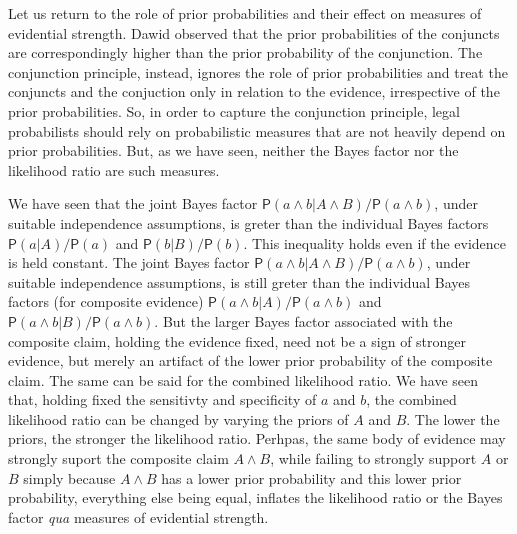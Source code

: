\documentclass[
  10pt,
  dvipsnames,enabledeprecatedfontcommands]{scrartcl}
\newcommand{\pr}[1]{\mathsf{P}(#1)}
\begin{document}
Let us return to the role of prior probabilities and their effect on
measures of evidential strength. Dawid observed that the prior
probabilities of the conjuncts are correspondingly higher than the prior
probability of the conjunction. The conjunction principle, instead,
ignores the role of prior probabilities and treat the conjuncts and the
conjuction only in relation to the evidence, irrespective of the prior
probabilities. So, in order to capture the conjunction principle, legal
probabilists should rely on probabilistic measures that are not heavily
depend on prior probabilities. But, as we have seen, neither the Bayes
factor nor the likelihood ratio are such measures.

We have seen that the joint Bayes factor
\(\pr{a \wedge b\vert A\wedge B}/\pr{a \wedge b}\), under suitable
independence assumptions, is greter than the individual Bayes factors
\(\pr{a \vert A}/\pr{a}\) and \(\pr{b|B}/\pr{b}\). This inequality holds
even if the evidence is held constant. The joint Bayes factor
\(\pr{a \wedge b\vert A\wedge B}/\pr{a \wedge b}\), under suitable
independence assumptions, is still greter than the individual Bayes
factors (for composite evidence)
\(\pr{a \wedge b \vert A}/\pr{a\wedge b}\) and
\(\pr{a\wedge b|B}/\pr{a\wedge b}\). But the larger Bayes factor
associated with the composite claim, holding the evidence fixed, need
not be a sign of stronger evidence, but merely an artifact of the lower
prior probability of the composite claim. The same can be said for the
combined likelihood ratio. We have seen that, holding fixed the
sensitivty and specificity of \(a\) and \(b\), the combined likelihood
ratio can be changed by varying the priors of \(A\) and \(B\). The lower
the priors, the stronger the likelihood ratio. Perhpas, the same body of
evidence may strongly suport the composite claim \(A\wedge B\), while
failing to strongly support \(A\) or \(B\) simply because \(A\wedge B\)
has a lower prior probability and this lower prior probability,
everything else being equal, inflates the likelihood ratio or the Bayes
factor \textit{qua} measures of evidential strength.
\end{document}

